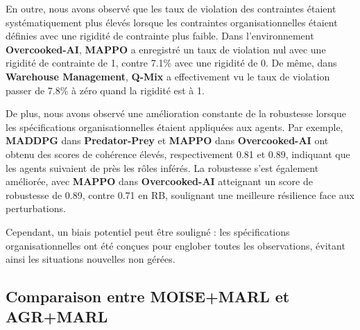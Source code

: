 \documentclass[francais,ROIA,Unicode,manuscript]{cedram}
\begin{document}
En outre, nous avons observé que les taux de violation des contraintes étaient systématiquement plus élevés lorsque les contraintes organisationnelles étaient définies avec une rigidité de contrainte plus faible. Dans l'environnement \textbf{Overcooked-AI}, \textbf{MAPPO} a enregistré un taux de violation nul avec une rigidité de contrainte de 1, contre 7.1\% avec une rigidité de 0. De même, dans \textbf{Warehouse Management}, \textbf{Q-Mix} a effectivement vu le taux de violation passer de 7.8\% à zéro quand la rigidité est à 1.

De plus, nous avons observé une amélioration constante de la robustesse lorsque les spécifications organisationnelles étaient appliquées aux agents. Par exemple, \textbf{MADDPG} dans \textbf{Predator-Prey} et \textbf{MAPPO} dans \textbf{Overcooked-AI} ont obtenu des scores de cohérence élevés, respectivement 0.81 et 0.89, indiquant que les agents suivaient de près les rôles inférés. La robustesse s'est également améliorée, avec \textbf{MAPPO} dans \textbf{Overcooked-AI} atteignant un score de robustesse de 0.89, contre 0.71 en RB, soulignant une meilleure résilience face aux perturbations.

Cependant, un biais potentiel peut être souligné : les spécifications organisationnelles ont été conçues pour englober toutes les observations, évitant ainsi les situations nouvelles non gérées.

\subsection{Comparaison entre MOISE+MARL et AGR+MARL}
\end{document}

